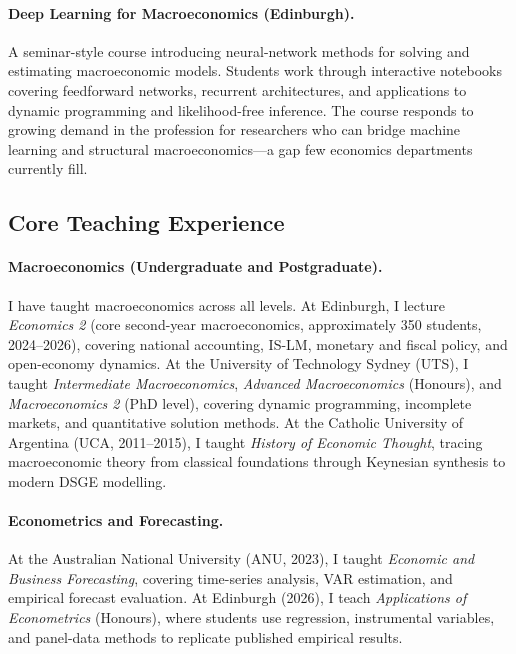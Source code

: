 \documentclass[12pt,a4paper]{article}
\begin{document}
\paragraph{Deep Learning for Macroeconomics (Edinburgh).}
A seminar-style course introducing neural-network methods for solving and estimating macroeconomic models. Students work through interactive notebooks covering feedforward networks, recurrent architectures, and applications to dynamic programming and likelihood-free inference. The course responds to growing demand in the profession for researchers who can bridge machine learning and structural macroeconomics---a gap few economics departments currently fill.

\subsection*{Core Teaching Experience}
\vspace{-0.3cm}

\paragraph{Macroeconomics (Undergraduate and Postgraduate).} I have taught macroeconomics across all levels. At Edinburgh, I lecture \textit{Economics 2} (core second-year macroeconomics, approximately 350 students, 2024--2026), covering national accounting, IS-LM, monetary and fiscal policy, and open-economy dynamics. At the University of Technology Sydney (UTS), I taught \textit{Intermediate Macroeconomics}, \textit{Advanced Macroeconomics} (Honours), and \textit{Macroeconomics 2} (PhD level), covering dynamic programming, incomplete markets, and quantitative solution methods. At the Catholic University of Argentina (UCA, 2011--2015), I taught \textit{History of Economic Thought}, tracing macroeconomic theory from classical foundations through Keynesian synthesis to modern DSGE modelling.

\paragraph{Econometrics and Forecasting.} At the Australian National University (ANU, 2023), I taught \textit{Economic and Business Forecasting}, covering time-series analysis, VAR estimation, and empirical forecast evaluation. At Edinburgh (2026), I teach \textit{Applications of Econometrics} (Honours), where students use regression, instrumental variables, and panel-data methods to replicate published empirical results.
\end{document}
